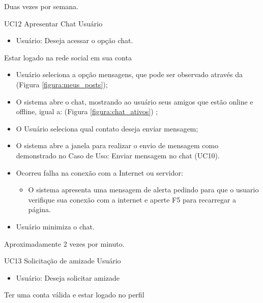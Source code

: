 {Duas vezes por semana.}
{

}
\casoDeUso
{UC12}
{Apresentar Chat}
{Usuário}
{
\begin{itemize}
	\item Usuário: Deseja acessar o opção chat.	
\end{itemize}

}
{Estar logado na rede social em sua conta}
{}
{
\begin{itemize}
	\item Usuário seleciona a opção mensagens, que pode ser observado através da (Figura \ref{figura:meus_posts});	
	\item O sistema abre o chat, mostrando ao usuário seus amigos que estão online  e offline, igual a:  (Figura \ref{figura:chat_ativos}) ;	
	\item O Usuário seleciona qual contato deseja enviar mensagem;
	\item O sistema abre a janela para realizar o envio de mensagem como demonstrado no Caso de Uso: Enviar mensagem no chat (UC10).  
					
\end{itemize}
}
{
\begin{itemize}
	\item Ocorreu falha na conexão com a Internet ou servidor:
	\begin{itemize}
	\item O sistema apresenta uma mensagem de alerta pedindo para que o usuario verifique sua conexão com a internet e aperte F5 para recarregar a página. 	
	\end{itemize}
	\item Usuário minimiza o chat. 
\end{itemize}
}
{Aproximadamente 2 vezes por minuto.}
{

}
\casoDeUso
{UC13}
{Solicitação de amizade}
{Usuário}
{
\begin{itemize}
	\item Usuário: Deseja solicitar amizade
\end{itemize}

}
{Ter uma conta válida e estar logado no perfil}
